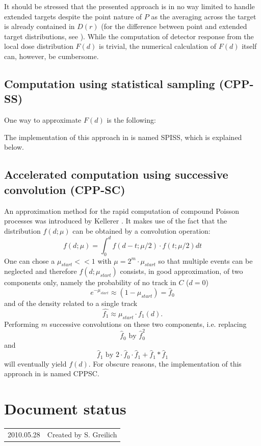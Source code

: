 It should be stressed that the presented approach is in no way limited to handle extended targets despite the point nature of $P$ as the averaging across the target is already contained in $D(r)$ (for the difference between point and extended target distributions, see \cite{Katz_et_al_1972, Edmund_et_al_2007}). While the computation of detector response from the local dose distribution $F(d)$ is trivial, the numerical calculation of $F(d)$ itself can, however, be cumbersome. 



\subsection{Computation using statistical sampling (CPP-SS)}
One way to approximate $F(d)$ is the following:


The implementation of this approach in \la{} is named SPISS, which is explained below.



\subsection{Accelerated computation using successive convolution (CPP-SC)}
An approximation method for the rapid computation of compound Poisson processes was introduced by Kellerer \cite{Kellerer_1985}. It makes use of the fact that the distribution $f(d;\mu)$ can be obtained by a convolution operation:
	\begin{equation}
		f(d;\mu)=\int_{0}^{d}{f(d-t;\mu/2)\cdot f(t;\mu/2) dt}
	\end{equation}
One can chose a $\mu_{start}<<1$ with $\mu=2^m\cdot\mu_{start}$ so that multiple events can be neglected and therefore $f(d;\mu_{start})$ consists, in good approximation, of two components only, namely the probability of no track in $C$ ($d=0$) 
	\begin{equation}
		e^{-\mu_{start}}\approx (1-\mu_{start})=\hat{f}_0
	\end{equation}
and of the density related to a single track
	\begin{equation}
		\hat{f_1}\approx\mu_{start}\cdot f_1(d).
	\end{equation}
Performing $m$ successive convolutions on these two components, i.e. replacing
	\begin{equation}
		\hat{f}_0 \mbox{ by } \hat{f}_0^2
	\end{equation}
and
	\begin{equation}
		\hat{f}_1 \mbox{ by } 2\cdot\hat{f}_0\cdot\hat{f}_1 + \hat{f}_1*\hat{f}_1
	\end{equation}
will eventually yield $f(d)$. For obscure reasons, the implementation of this approach in \la{} is named CPPSC.




\section*{Document status}
\begin{tabular}{l l}
2010.05.28&Created by S. Greilich
\end{tabular}